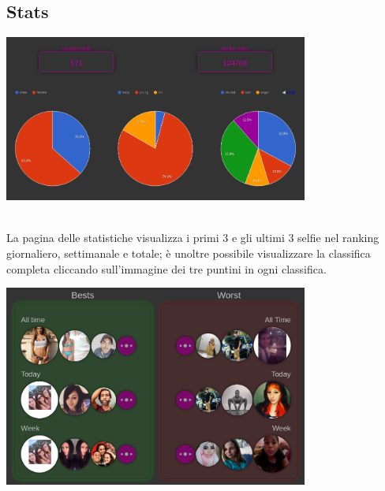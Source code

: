\documentclass{article}
\begin{document}
\subsection{Stats}
\begin{center}\includegraphics[width=0.75\textwidth]{res/stat.png}\end{center}\\
La pagina delle statistiche visualizza i primi 3 e gli ultimi 3 selfie nel ranking giornaliero, settimanale e totale; è unoltre possibile visualizzare la classifica completa cliccando sull'immagine dei tre puntini in ogni classifica.
\begin{center}\includegraphics[width=0.75\textwidth]{res/stat2.png}\end{center}\\
\end{document}
